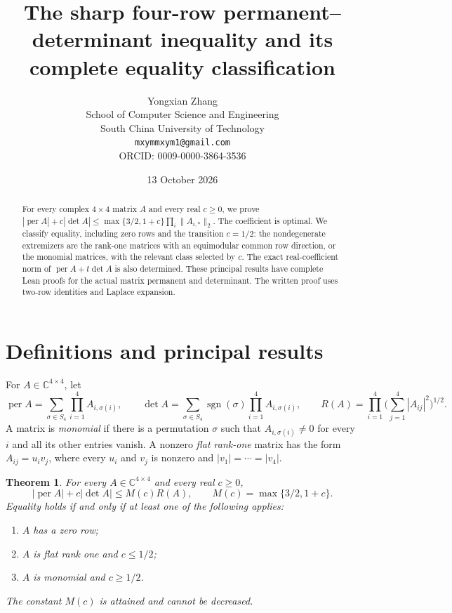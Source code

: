 \documentclass[11pt]{article}
\title{The sharp four-row permanent--determinant inequality and its complete equality classification}
\author{Yongxian Zhang\\[2pt]
\small School of Computer Science and Engineering\\
\small South China University of Technology\\
\small\texttt{mxymmxym1@gmail.com}\\
\small ORCID: 0009-0000-3864-3536}
\date{13 October 2026}
\DeclareMathOperator{\per}{per}
\newtheorem{theorem}{Theorem}
\begin{document}
\maketitle
\begin{abstract}
For every complex $4\times4$ matrix $A$ and every real $c\ge0$, we prove
$|\operatorname{per} A|+c|\det A|\le\max\{3/2,1+c\}\prod_i\|A_{i,*}\|_2$.
The coefficient is optimal. We classify equality, including zero rows and
the transition $c=1/2$: the nondegenerate extremizers are the rank-one
matrices with an equimodular common row direction, or the monomial matrices,
with the relevant class selected by $c$. The exact real-coefficient norm
of $\operatorname{per} A+t\det A$ is also determined. These principal results have
complete Lean proofs for the actual matrix permanent and determinant.
The written proof uses two-row identities and Laplace expansion.
\end{abstract}

\section{Definitions and principal results}
For $A\in\mathbb C^{4\times4}$, let
\[
 \per A=\sum_{\sigma\in S_4}\prod_{i=1}^4 A_{i,\sigma(i)},\qquad
 \det A=\sum_{\sigma\in S_4}\operatorname{sgn}(\sigma)
                         \prod_{i=1}^4 A_{i,\sigma(i)},
 \qquad R(A)=\prod_{i=1}^4\Big(\sum_{j=1}^4|A_{ij}|^2\Big)^{1/2}.
\]
A matrix is \emph{monomial} if there is a permutation $\sigma$ such that
$A_{i,\sigma(i)}\ne0$ for every $i$ and all its other entries vanish.
A nonzero \emph{flat rank-one} matrix has the form
$A_{ij}=u_i v_j$, where every $u_i$ and $v_j$ is nonzero and
$|v_1|=\cdots=|v_4|$.

\begin{theorem}\label{thm:main}
For every $A\in\mathbb C^{4\times4}$ and every real $c\ge0$,
\begin{equation}\label{eq:main}
 |\per A|+c|\det A|\le M(c)R(A),\qquad
 M(c)=\max\{3/2,1+c\}.
\end{equation}
Equality holds if and only if at least one of the following applies:
\begin{enumerate}
\item $A$ has a zero row;
\item $A$ is flat rank one and $c\le1/2$;
\item $A$ is monomial and $c\ge1/2$.
\end{enumerate}
The constant $M(c)$ is attained and cannot be decreased.
\end{theorem}
\end{document}
